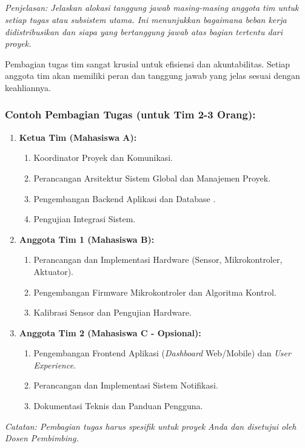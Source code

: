 \documentclass{elsinta}
\begin{document}
\subsection{\TeamDivisionTitle}
\textit{Penjelasan: Jelaskan alokasi tanggung jawab masing-masing anggota tim untuk setiap tugas atau subsistem utama. Ini menunjukkan bagaimana beban kerja didistribusikan dan siapa yang bertanggung jawab atas bagian tertentu dari proyek.}

Pembagian tugas tim sangat krusial untuk efisiensi dan akuntabilitas. Setiap anggota tim akan memiliki peran dan tanggung jawab yang jelas sesuai dengan keahliannya.

\subsubsection*{Contoh Pembagian Tugas (untuk Tim 2-3 Orang):}
\begin{enumerate}
    \item \textbf{Ketua Tim (Mahasiswa A):}
    \begin{enumerate}
        \item Koordinator Proyek dan Komunikasi.
        \item Perancangan Arsitektur Sistem Global dan Manajemen Proyek.
        \item Pengembangan Backend Aplikasi dan Database .
        \item Pengujian Integrasi Sistem.
    \end{enumerate}
    \item \textbf{Anggota Tim 1 (Mahasiswa B):}
    \begin{enumerate}
        \item Perancangan dan Implementasi Hardware (Sensor, Mikrokontroler, Aktuator).
        \item Pengembangan Firmware Mikrokontroler dan Algoritma Kontrol.
        \item Kalibrasi Sensor dan Pengujian Hardware.
    \end{enumerate}
    \item \textbf{Anggota Tim 2 (Mahasiswa C - Opsional):}
    \begin{enumerate}
        \item Pengembangan Frontend Aplikasi (\emph{Dashboard} Web/Mobile) dan \emph{User Experience}.
        \item Perancangan dan Implementasi Sistem Notifikasi.
        \item Dokumentasi Teknis dan Panduan Pengguna.
    \end{enumerate}
\end{enumerate}
\textit{Catatan: Pembagian tugas harus spesifik untuk proyek Anda dan disetujui oleh Dosen Pembimbing.}
\end{document}
